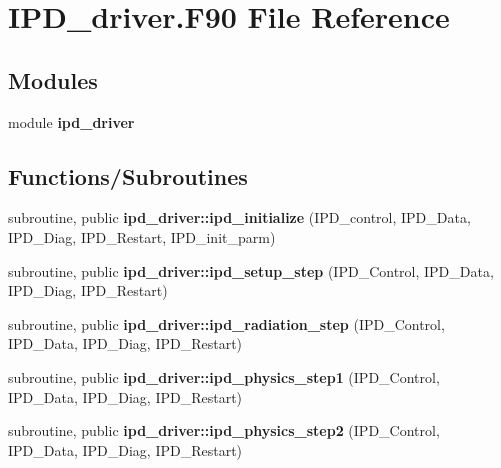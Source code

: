 \section{I\+P\+D\+\_\+driver.\+F90 File Reference}
\label{_i_p_d__driver_8_f90}
\subsection*{Modules}
\begin{DoxyCompactItemize}
\item 
module \textbf{ ipd\+\_\+driver}
\end{DoxyCompactItemize}
\subsection*{Functions/\+Subroutines}
\begin{DoxyCompactItemize}
\item 
subroutine, public \textbf{ ipd\+\_\+driver\+::ipd\+\_\+initialize} (I\+P\+D\+\_\+control, I\+P\+D\+\_\+\+Data, I\+P\+D\+\_\+\+Diag, I\+P\+D\+\_\+\+Restart, I\+P\+D\+\_\+init\+\_\+parm)
\item 
subroutine, public \textbf{ ipd\+\_\+driver\+::ipd\+\_\+setup\+\_\+step} (I\+P\+D\+\_\+\+Control, I\+P\+D\+\_\+\+Data, I\+P\+D\+\_\+\+Diag, I\+P\+D\+\_\+\+Restart)
\item 
subroutine, public \textbf{ ipd\+\_\+driver\+::ipd\+\_\+radiation\+\_\+step} (I\+P\+D\+\_\+\+Control, I\+P\+D\+\_\+\+Data, I\+P\+D\+\_\+\+Diag, I\+P\+D\+\_\+\+Restart)
\item 
subroutine, public \textbf{ ipd\+\_\+driver\+::ipd\+\_\+physics\+\_\+step1} (I\+P\+D\+\_\+\+Control, I\+P\+D\+\_\+\+Data, I\+P\+D\+\_\+\+Diag, I\+P\+D\+\_\+\+Restart)
\item 
subroutine, public \textbf{ ipd\+\_\+driver\+::ipd\+\_\+physics\+\_\+step2} (I\+P\+D\+\_\+\+Control, I\+P\+D\+\_\+\+Data, I\+P\+D\+\_\+\+Diag, I\+P\+D\+\_\+\+Restart)
\end{DoxyCompactItemize}
